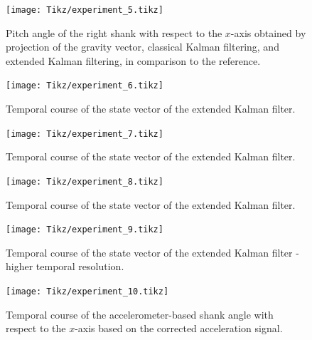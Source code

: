 \begin{figure}
	\centering
	\setlength\figureheight{7cm} 
	\setlength\figurewidth{\textwidth}
	\texttt{[image: Tikz/experiment\_5.tikz]}
	\caption{Pitch angle of the right shank with respect to the $x$-axis obtained by projection of the gravity vector, classical Kalman filtering, and extended Kalman filtering, in comparison to the reference.}
	\label{fig:experiment_5}
\end{figure}

\begin{figure}
	\centering
	\setlength\figureheight{7cm} 
	\setlength\figurewidth{\textwidth}
	\texttt{[image: Tikz/experiment\_6.tikz]}
	\caption{Temporal course of the state vector of the extended Kalman filter.}
	\label{fig:experiment_6}
\end{figure}

\begin{figure}
	\centering
	\setlength\figureheight{7cm} 
	\setlength\figurewidth{\textwidth}
	\texttt{[image: Tikz/experiment\_7.tikz]}
	\caption{Temporal course of the state vector of the extended Kalman filter.}
	\label{fig:experiment_7}
\end{figure}

\begin{figure}
	\centering
	\setlength\figureheight{7cm} 
	\setlength\figurewidth{\textwidth}
	\texttt{[image: Tikz/experiment\_8.tikz]}
	\caption{Temporal course of the state vector of the extended Kalman filter.}
	\label{fig:experiment_8}
\end{figure}

\begin{figure}
	\centering
	\setlength\figureheight{7cm} 
	\setlength\figurewidth{\textwidth}
	\texttt{[image: Tikz/experiment\_9.tikz]}
	\caption{Temporal course of the state vector of the extended Kalman filter - higher temporal resolution.}
	\label{fig:experiment_9}
\end{figure}

\begin{figure}
	\centering
	\setlength\figureheight{7cm} 
	\setlength\figurewidth{\textwidth}
	\texttt{[image: Tikz/experiment\_10.tikz]}
	\caption{Temporal course of the accelerometer-based shank angle with respect to the $x$-axis based on the corrected acceleration signal.}
	\label{fig:experiment_10}
\end{figure}

